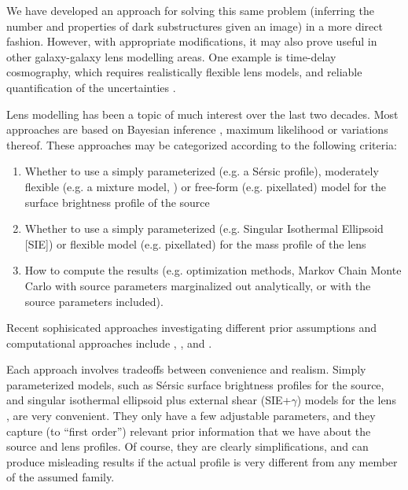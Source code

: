 \documentclass[useAMS,usenatbib]{mn2e}
\begin{document}
We have developed an approach for solving this same problem (inferring the
number and properties of dark substructures given an image) in a more direct
fashion. However, with appropriate modifications, it may also prove useful in other
galaxy-galaxy lens modelling areas. One example is time-delay cosmography, which
requires realistically flexible lens models, and reliable quantification
of the uncertainties
\citep{2013ApJ...766...70S, 2014ApJ...788L..35S, grillo}.

Lens modelling has been a topic of much interest over the last two decades.
Most approaches are based on Bayesian inference \citep{sivia, ohagan}, maximum
likelihood \citep{millar} or
variations thereof. These approaches may be categorized according to the
following criteria:
\begin{enumerate}
\item Whether to use a simply parameterized (e.g. a Sérsic profile),
moderately flexible (e.g. a mixture model, \citet{2011MNRAS.412.2521B})
or free-form (e.g. pixellated) model for the surface brightness profile of the source
\item Whether to use a simply parameterized (e.g. Singular Isothermal Ellipsoid
[SIE]) or flexible model (e.g. pixellated) for the mass profile of the lens
\item How to compute the results (e.g. optimization methods, Markov Chain
Monte Carlo with source parameters marginalized out analytically, or
with the source parameters included).
\end{enumerate}
Recent sophisicated approaches investigating different prior assumptions
and computational approaches include \citet{2014MNRAS.445.2181C},
\citet{2015arXiv150500198T}, and
\citet{2015arXiv150407629B}. 

Each approach involves tradeoffs between convenience and realism.
Simply parameterized models, such as Sérsic surface
brightness profiles for the source,
and singular isothermal ellipsoid plus
external shear (SIE+$\gamma$) models for the lens \citep{1994A&A...284..285K},
are very
convenient. They only have a few adjustable parameters, and they capture
(to ``first order'') relevant prior information that we have about the
source and lens profiles. Of course, they are clearly simplifications,
and can produce misleading results if the actual profile is very different
from any member of the assumed family.
\end{document}
